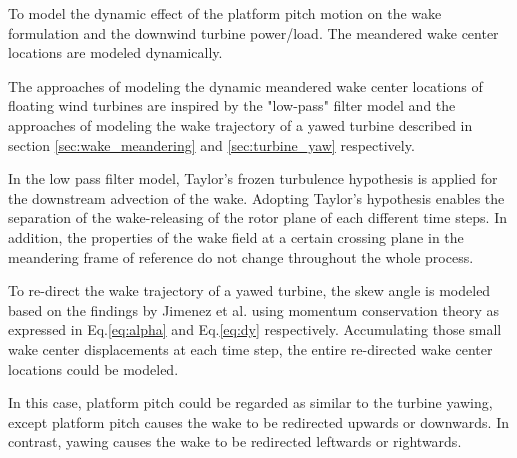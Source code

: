 \documentclass{umthesis}
\begin{document}
To model the dynamic effect of the platform pitch motion on the wake formulation and the downwind turbine power/load. The meandered wake center locations are modeled dynamically.

The approaches of modeling the dynamic meandered wake center locations of floating wind turbines are inspired by the "low-pass" filter model and the approaches of modeling the wake trajectory of a yawed turbine described in section \ref{sec:wake_meandering} and \ref{sec:turbine_yaw} respectively. 

In the low pass filter model, Taylor's frozen turbulence hypothesis is applied for the downstream advection of the wake. Adopting Taylor's hypothesis enables the separation of the wake-releasing of the rotor plane of each different time steps. In addition, the properties of the wake field at a certain crossing plane in the meandering frame of reference do not change throughout the whole process.

To re-direct the wake trajectory of a yawed turbine, the skew angle is modeled based on the findings by Jimenez et al. using momentum conservation theory \cite{Jiménez} as expressed in Eq.\ref{eq:alpha} and Eq.\ref{eq:dy} respectively. Accumulating those small wake center displacements at each time step, the entire re-directed wake center locations could be modeled. 

In this case, platform pitch could be regarded as similar to the turbine yawing, except platform pitch causes the wake to be redirected upwards or downwards. In contrast, yawing causes the wake to be redirected leftwards or rightwards.
\end{document}
